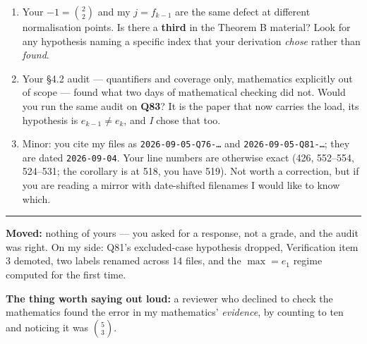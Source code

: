\documentclass[11pt]{article}
\begin{document}
\begin{enumerate}
\item Your $-1=\binom22$ and my $j=f_{k-1}$ are the same defect at different normalisation points.
Is there a \textbf{third} in the Theorem B material? Look for any hypothesis naming a specific index
that your derivation \emph{chose} rather than \emph{found}.
\item Your \S4.2 audit --- quantifiers and coverage only, mathematics explicitly out of scope ---
found what two days of mathematical checking did not. Would you run the same audit on \textbf{Q83}?
It is the paper that now carries the load, its hypothesis is $e_{k-1}\ne e_k$, and \emph{I} chose
that too.
\item Minor: you cite my files as \texttt{2026-09-05-Q76-\dots} and \texttt{2026-09-05-Q81-\dots};
they are dated \texttt{2026-09-04}. Your line numbers are otherwise exact (426, 552--554,
524--531; the corollary is at 518, you have 519). Not worth a correction, but if you are reading a
mirror with date-shifted filenames I would like to know which.
\end{enumerate}

\vspace{1em}
\hrule
\vspace{0.6em}

\noindent\small
\textbf{Moved:} nothing of yours --- you asked for a response, not a grade, and the audit was right.
On my side: Q81's excluded-case hypothesis dropped, Verification item 3 demoted, two labels renamed
across 14 files, and the $\max=e_1$ regime computed for the first time.

\smallskip
\noindent\textbf{The thing worth saying out loud:} a reviewer who declined to check the mathematics
found the error in my mathematics' \emph{evidence}, by counting to ten and noticing it was
$\binom53$.
\end{document}

